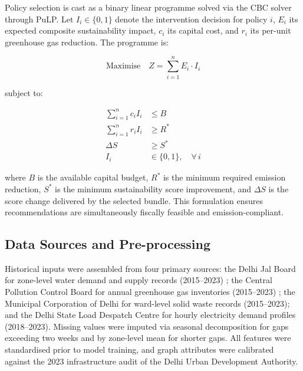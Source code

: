 \documentclass[conference]{IEEEtran}
\begin{document}
Policy selection is cast as a binary linear programme solved via the
CBC solver through PuLP. Let $I_i \in \{0,1\}$ denote the intervention
decision for policy $i$, $E_i$ its expected composite sustainability
impact, $c_i$ its capital cost, and $r_i$ its per-unit greenhouse gas
reduction. The programme is:

\begin{equation}
\text{Maximise}\quad Z = \sum_{i=1}^{n} E_i \cdot I_i
\label{eq:obj}
\end{equation}

subject to:

\begin{align}
\sum_{i=1}^{n} c_i I_i &\leq B \label{eq:budget}\\
\sum_{i=1}^{n} r_i I_i &\geq R^* \label{eq:emission}\\
\Delta S &\geq S^* \label{eq:score}\\
I_i &\in \{0,1\},\quad \forall\, i \label{eq:binary}
\end{align}

where $B$ is the available capital budget, $R^*$ is the minimum required
emission reduction, $S^*$ is the minimum sustainability score
improvement, and $\Delta S$ is the score change delivered by the
selected bundle. This formulation ensures recommendations are
simultaneously fiscally feasible and emission-compliant.

\subsection{Data Sources and Pre-processing}

Historical inputs were assembled from four primary sources: the Delhi
Jal Board for zone-level water demand and supply records (2015--2023)
\cite{djb2023}; the Central Pollution Control Board for annual greenhouse
gas inventories (2015--2023) \cite{cpcb2023}; the Municipal Corporation
of Delhi for ward-level solid waste records (2015--2023); and the Delhi
State Load Despatch Centre for hourly electricity demand profiles
(2018--2023). Missing values were imputed via seasonal decomposition for
gaps exceeding two weeks and by zone-level mean for shorter gaps. All
features were standardised prior to model training, and graph attributes
were calibrated against the 2023 infrastructure audit of the Delhi Urban
Development Authority.

\end{document}
